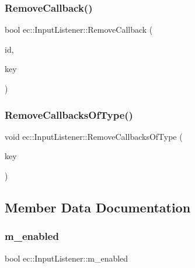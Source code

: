 \subsubsection{\texorpdfstring{Remove\+Callback()}{RemoveCallback()}}
{\footnotesize\ttfamily bool ec\+::\+Input\+Listener\+::\+Remove\+Callback (\begin{DoxyParamCaption}\item[{const std\+::string \&}]{id,  }\item[{\mbox{\hyperlink{namespaceec_a5de6bdb8c4b2ed6e590e721ec998f964}{Event\+Key\+\_\+T}}}]{key }\end{DoxyParamCaption})}

\mbox{\label{classec_1_1_input_listener_ae5cf00215ffda9b797e7d6954da2acef}} 
\subsubsection{\texorpdfstring{Remove\+Callbacks\+Of\+Type()}{RemoveCallbacksOfType()}}
{\footnotesize\ttfamily void ec\+::\+Input\+Listener\+::\+Remove\+Callbacks\+Of\+Type (\begin{DoxyParamCaption}\item[{\mbox{\hyperlink{namespaceec_a5de6bdb8c4b2ed6e590e721ec998f964}{Event\+Key\+\_\+T}}}]{key }\end{DoxyParamCaption})}



\subsection{Member Data Documentation}
\mbox{\label{classec_1_1_input_listener_af36b5fc46ed59886d73b1613aaef5a47}} 
\subsubsection{\texorpdfstring{m\+\_\+enabled}{m\_enabled}}
{\footnotesize\ttfamily bool ec\+::\+Input\+Listener\+::m\+\_\+enabled\hspace{0.3cm}{\ttfamily [protected]}}

